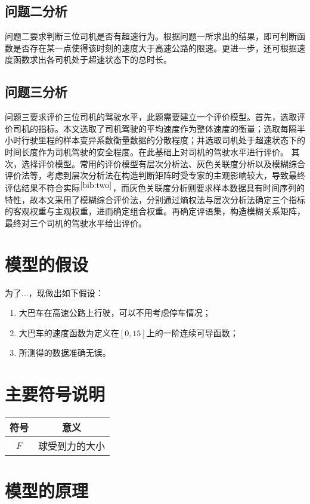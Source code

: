 \documentclass[bwprint]{cumcmthesis}
\begin{document}
        \subsection{问题二分析}
        问题二要求判断三位司机是否有超速行为。根据问题一所求出的结果，即可判断函数是否存在某一点使得该时刻的速度大于高速公路的限速。更进一步，还可根据速度函数求出各司机处于超速状态下的总时长。
        \subsection{问题三分析}
        问题三要求评价三位司机的驾驶水平，此题需要建立一个评价模型。首先，选取评价司机的指标。本文选取了司机驾驶的平均速度作为整体速度的衡量；选取每隔半小时行驶里程的样本变异系数衡量数据的分散程度；并选取司机处于超速状态下的时间长度作为司机驾驶的安全程度。在此基础上对司机的驾驶水平进行评价。
        其次，选择评价模型。常用的评价模型有层次分析法、灰色关联度分析以及模糊综合评价法等，考虑到层次分析法在构造判断矩阵时受专家的主观影响较大，导致最终评估结果不符合实际$^{\cite{bib:two}}$，而灰色关联度分析则要求样本数据具有时间序列的特性，故本文采用了模糊综合评价法，分别通过熵权法与层次分析法确定三个指标的客观权重与主观权重，进而确定组合权重。再确定评语集，构造模糊关系矩阵，最终对三个司机的驾驶水平给出评价。
    \section{模型的假设}
        为了...，现做出如下假设：
        \begin{enumerate}
            \item 大巴车在高速公路上行驶，可以不用考虑停车情况；
            \item 大巴车的速度函数为定义在$[0,15]$上的一阶连续可导函数；
            \item 所测得的数据准确无误。
        \end{enumerate}
    \section{主要符号说明}
        \begin{tabular}{cc}
            \hline
            符号	&  意义 \\ \hline
            $F$    & 球受到力的大小 \\ \hline
        \end{tabular}
    \section{模型的原理}
\end{document}
